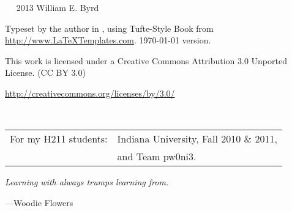\documentclass{tufte-book} %
\newcommand{\blankpage}{\newpage\hbox{}\thispagestyle{empty}\newpage} %
\begin{document}
\begin{schemeregion}

\frontmatter
{} %



\blankpage




\newpage

\begin{fullwidth}
~\vfill
\thispagestyle{empty}
\setlength{\parindent}{0pt}
\setlength{\parskip}{\baselineskip}
\large
\noindent
\textcopyright~2013 William E. Byrd

\noindent
Typeset by the author in \XeLaTeX, using Tufte-Style Book from \url{http://www.LaTeXTemplates.com}. \today\xspace version.

\huge
\noindent
\ccLogo
\ccAttribution

\large
\noindent
This work is licensed under a Creative Commons Attribution 3.0 Unported License.
(CC BY 3.0)

\noindent
\url{http://creativecommons.org/licenses/by/3.0/}
\normalsize
\end{fullwidth}



\cleardoublepage
\thispagestyle{empty}
\begin{fullwidth}
~\vfill
\begin{doublespace}
\noindent\fontsize{18}{22}\selectfont\itshape
\nohyphenation
\begin{tabular}{ll}
For my H211 students: & Indiana University, Fall 2010 \& 2011, \\ 
& and Team pw0ni3.
\end{tabular}
\end{doublespace}
\begin{flushright}
\Large
\textit{Learning with always trumps learning from.}

\wspace

---Woodie Flowers
\normalsize
\end{flushright}
\vfill
\vfill
\end{fullwidth}



\end{schemeregion}
\end{document}
